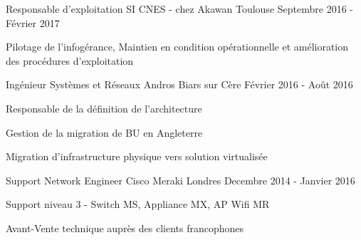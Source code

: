 \begin{cventries}
  \cventry
    {Responsable d'exploitation SI} %
    {CNES - chez Akawan} %
    {Toulouse} %
    {Septembre 2016 - Février 2017} %
    {
      \begin{cvitems} %
        \item {Pilotage de l'infogérance, Maintien en condition opérationnelle et amélioration des procédures d'exploitation}
      \end{cvitems}
    }
    
  \cventry
  {Ingénieur Systèmes et Réseaux} %
  {Andros} %
  {Biars sur Cère} %
  {Février 2016 - Août 2016} %
  {
    \begin{cvitems} %
      \item {Responsable de la définition de l'architecture}
      \item {Gestion de la migration de BU en Angleterre}
      \item {Migration d'infrastructure physique vers solution virtualisée}
    \end{cvitems}
}

  \cventry
    {Support Network Engineer} %
    {Cisco Meraki} %
    {Londres} %
    {Decembre 2014 - Janvier 2016} %
    {
      \begin{cvdoubleitems} %
        \item {Support niveau 3 - Switch MS, Appliance MX, AP Wifi MR}
        \item {Avant-Vente technique auprès des clients francophones}
      \end{cvdoubleitems}
    }

\end{cventries}
